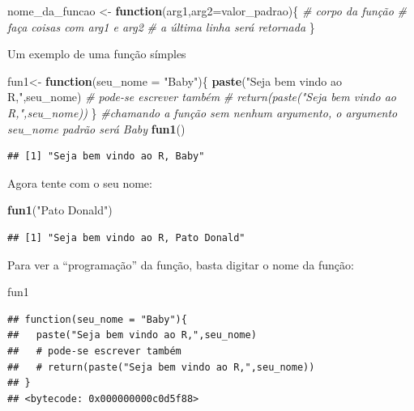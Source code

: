 \documentclass[
]{book}
\newenvironment{Shaded}{\begin{snugshade}}{\end{snugshade}}
\newcommand{\CommentTok}[1]{\textcolor[rgb]{0.56,0.35,0.01}{\textit{#1}}}
\newcommand{\ControlFlowTok}[1]{\textcolor[rgb]{0.13,0.29,0.53}{\textbf{#1}}}
\newcommand{\DataTypeTok}[1]{\textcolor[rgb]{0.13,0.29,0.53}{#1}}
\newcommand{\KeywordTok}[1]{\textcolor[rgb]{0.13,0.29,0.53}{\textbf{#1}}}
\newcommand{\NormalTok}[1]{#1}
\newcommand{\StringTok}[1]{\textcolor[rgb]{0.31,0.60,0.02}{#1}}
\theoremstyle{definition}
\theoremstyle{definition}
\theoremstyle{definition}
\theoremstyle{remark}
\begin{document}
\begin{Shaded}
\begin{Highlighting}[]
\NormalTok{nome_da_funcao <-}\StringTok{ }\ControlFlowTok{function}\NormalTok{(arg1,}\DataTypeTok{arg2=}\NormalTok{valor_padrao)\{}
  \CommentTok{# corpo da função}
  \CommentTok{# faça coisas com arg1 e arg2}
  \CommentTok{# a última linha será retornada}
\NormalTok{\}}
\end{Highlighting}
\end{Shaded}

Um exemplo de uma função símples

\begin{Shaded}
\begin{Highlighting}[]
\NormalTok{ fun1<-}\StringTok{ }\ControlFlowTok{function}\NormalTok{(}\DataTypeTok{seu_nome =} \StringTok{"Baby"}\NormalTok{)\{}
  \KeywordTok{paste}\NormalTok{(}\StringTok{"Seja bem vindo ao R,"}\NormalTok{,seu_nome)}
  \CommentTok{# pode-se escrever também}
  \CommentTok{# return(paste("Seja bem vindo ao R,",seu_nome))}
\NormalTok{\}}
\CommentTok{#chamando a função sem nenhum argumento, o argumento seu_nome padrão será Baby}
\KeywordTok{fun1}\NormalTok{()}
\end{Highlighting}
\end{Shaded}

\begin{verbatim}
## [1] "Seja bem vindo ao R, Baby"
\end{verbatim}

Agora tente com o seu nome:

\begin{Shaded}
\begin{Highlighting}[]
\KeywordTok{fun1}\NormalTok{(}\StringTok{"Pato Donald"}\NormalTok{)}
\end{Highlighting}
\end{Shaded}

\begin{verbatim}
## [1] "Seja bem vindo ao R, Pato Donald"
\end{verbatim}

Para ver a ``programação'' da função, basta digitar o nome da função:

\begin{Shaded}
\begin{Highlighting}[]
\NormalTok{fun1}
\end{Highlighting}
\end{Shaded}

\begin{verbatim}
## function(seu_nome = "Baby"){
##   paste("Seja bem vindo ao R,",seu_nome)
##   # pode-se escrever também
##   # return(paste("Seja bem vindo ao R,",seu_nome))
## }
## <bytecode: 0x000000000c0d5f88>
\end{verbatim}
\end{document}
